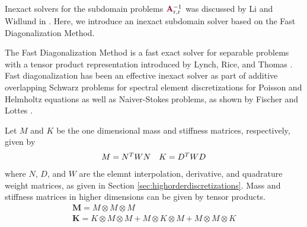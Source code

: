 Inexact solvers for the subdomain problems ${\color{burgundy}\mathbf{A}}_{\text{r}, \text{r}}^{-1}$ was discussed by Li and Widlund in \cite{li2007use}.
Here, we introduce an inexact subdomain solver based on the Fast Diagonalization Method.

The Fast Diagonalization Method is a fast exact solver for separable problems with a tensor product representation introduced by Lynch, Rice, and Thomas \cite{lynch1964direct}.
Fast diagonalization has been an effective inexact solver as part of additive overlapping Schwarz problems for spectral element discretizations for Poisson and Helmholtz equations as well as Naiver-Stokes problems, as shown by Fischer and Lottes \cite{fischer2005hybrid}.

Let $M$ and $K$ be the one dimensional mass and stiffness matrices, respectively, given by
\begin{equation}
\begin{array}{c c}
M = N^T W N  &  K = D^T W D
\end{array}
\end{equation}
where $N$, $D$, and $W$ are the elemnt interpolation, derivative, and quadrature weight matrices, as given in Section \ref{sec:highorderdiscretizations}.
Mass and stiffness matrices in higher dimensions can be given by tensor products.
\begin{equation}
\begin{array}{c}
\mathbf{M} = M \otimes M \otimes M  \\
\mathbf{K} = K \otimes M \otimes M + M \otimes K \otimes M + M \otimes M \otimes K  \\
\end{array}
\end{equation}

